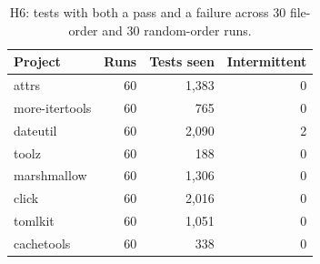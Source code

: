 \begin{table}[t]
\centering\small
\begin{tabular}{lrrr}
\toprule
Project & Runs & Tests seen & Intermittent \\
\midrule
attrs & 60 & 1,383 & 0 \\
more-itertools & 60 & 765 & 0 \\
dateutil & 60 & 2,090 & 2 \\
toolz & 60 & 188 & 0 \\
marshmallow & 60 & 1,306 & 0 \\
click & 60 & 2,016 & 0 \\
tomlkit & 60 & 1,051 & 0 \\
cachetools & 60 & 338 & 0 \\
\bottomrule
\end{tabular}
\caption{H6: tests with both a pass and a failure across 30 file-order and 30 random-order runs.}
\label{tab:h6}
\end{table}
